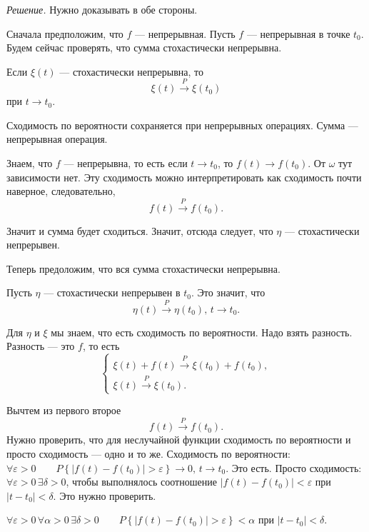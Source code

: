 \textit{Решение.}
Нужно доказывать в обе стороны.

Сначала предположим, что $f$ --- непрерывная.
Пусть $f$ --- непрерывная в точке $t_0$.
Будем сейчас проверять, что сумма стохастически непрерывна.

Если $ \xi \left( t \right) $ --- стохастически непрерывна, то
$$ \xi \left( t \right) \overset{P}{ \to }
  \xi \left( t_0 \right)$$
при $t \to t_0$.

Сходимость по вероятности сохраняется при непрерывных операциях.
Сумма --- непрерывная операция.

Знаем, что $f$ --- непрерывна, то есть если $t \to t_0$,
то $f \left( t \right) \to f \left( t_0 \right) $.
От $ \omega $ тут зависимости нет.
Эту сходимость можно интерпретировать как сходимость почти наверное, следовательно,
$$f \left( t \right) \overset{P}{ \to }
  f \left( t_0 \right).$$

Значит и сумма будет сходиться.
Значит, отсюда следует, что $ \eta $ --- стохастически непрерывен.

Теперь предоложим, что вся сумма стохастически непрерывна.

Пусть $ \eta $ --- стохастически непрерывен в $t_0$.
Это значит, что
$$ \eta \left( t \right) \overset{P}{ \to } \eta \left( t_0 \right), \,
  t \to t_0.$$

Для $ \eta $ и $ \xi $ мы знаем, что есть сходимость по вероятности.
Надо взять разность.
Разность --- это $f$, то есть
$$ \begin{cases}
    \xi \left( t \right) + f \left( t \right) \overset{P}{ \to }
    \xi \left( t_0 \right) + f \left( t_0 \right), \\
    \xi \left( t \right) \overset{P}{ \to } \xi \left( t_0 \right).
  \end{cases}$$

Вычтем из первого второе
$$f \left( t \right) \overset{P}{ \to }
  f \left( t_0 \right).$$
Нужно проверить, что для неслучайной функции сходимость по вероятности и просто сходимость ---
одно и то же.
Сходимость по вероятности:
$ \forall \varepsilon > 0 \qquad
  P \left\{ \left| f \left( t \right) - f \left( t_0 \right) \right| > \varepsilon \right\} \to 0,
  \, t \to t_0$.
Это есть.
Просто сходимость: $ \forall \varepsilon > 0 \, \exists \delta > 0$,
чтобы выполнялось соотношение
$ \left| f \left( t \right) - f \left( t_0 \right) \right| <
  \varepsilon $
при $ \left| t - t_0 \right| < \delta $.
Это нужно проверить.

$ \forall \varepsilon > 0 \, \forall \alpha > 0 \, \exists \delta > 0 \qquad
  P \left\{ \left| f \left( t \right) - f \left( t_0 \right) \right| > \varepsilon \right\} <
  \alpha $
при $ \left| t - t_0 \right| < \delta $.

